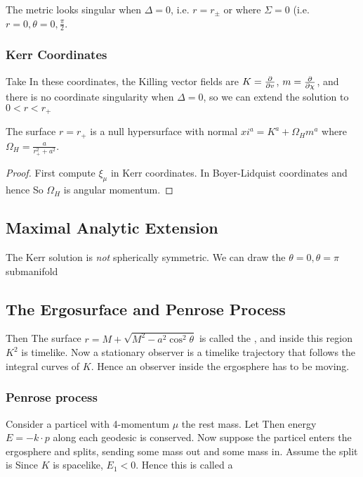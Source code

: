 \documentclass{article}
\begin{document}
The metric looks singular when $\Delta = 0$, i.e. $r = r_\pm$ or where $\Sigma = 0$ (i.e. $r=0, \theta=0,\frac{\pi}{2}$. 

\subsubsection*{Kerr Coordinates}
Take 
In these coordinates, the Killing vector fields are $K = \frac{\partial}{\partial v}$, $m = \frac{\partial}{\partial\chi}$, and there is no coordinate singularity when $\Delta = 0$, so we can extend the solution to $0<r<r_+$

\begin{prop}
The surface $r=r_+$ is a null hypersurface with normal $xi^a = K^a + \Omega_H m^a$ where $\Omega_H = \frac{a}{r_+^2 + a^2}$. 
\end{prop}
\begin{proof}
First compute $\xi_\mu$ in Kerr coordinates. 
In Boyer-Lidquist coordinates 
and hence
So $\Omega_H$ is angular momentum. 
\end{proof}

\subsection{Maximal Analytic Extension}
The Kerr solution is \emph{not} spherically symmetric. We can draw the $\theta=0, \theta=\pi$ submanifold

\subsection{The Ergosurface and Penrose Process}
Then 
The surface $r = M + \sqrt{M^2 - a^2 \cos^2 \theta}$ is called the , and inside this region $K^2$ is timelike. Now a stationary observer is a timelike trajectory that follows the integral curves of $K$. Hence an observer inside the ergosphere has to be moving. 

\subsubsection{Penrose process}
Consider a particel with 4-momentum 
$\mu$ the rest mass. Let 
Then energy $E = -k \cdot p$ along each geodesic is conserved. Now suppose the particel enters the ergosphere and splits, sending some mass out and some mass in. Assume  the split is 
Since $K$ is spacelike, $E_1<0$. Hence 
this is called a 
\end{document}
